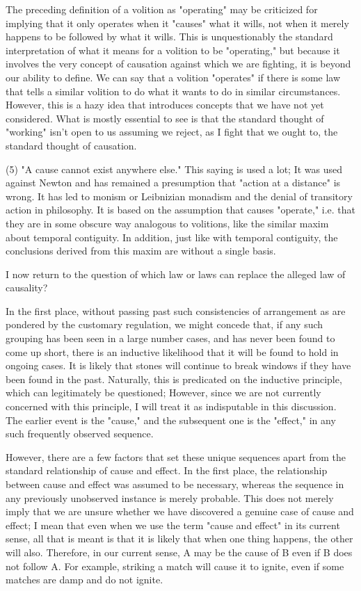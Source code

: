 \documentclass[a4paper,12pt]{book}[2004/02/16]
\theoremstyle{ilemma}
\theoremstyle{itheorem}
\theoremstyle{iother}
\theoremstyle{icorollary}
\theoremstyle{numcorollary}
\theoremstyle{idefinition}
\begin{document}
The preceding definition of a volition as "operating" may be criticized for implying that it only operates when it "causes" what it wills, not when it merely happens to be followed by what it wills. This is unquestionably the standard interpretation of what it means for a volition to be "operating," but because it involves the very concept of causation against which we are fighting, it is beyond our ability to define. We can say that a volition "operates" if there is some law that tells a similar volition to do what it wants to do in similar circumstances. However, this is a hazy idea that introduces concepts that we have not yet considered. What is mostly
essential to see is that the standard thought of "working" isn't
open to us assuming we reject, as I fight that we ought to, the standard thought
of causation.

(5) "A cause cannot exist anywhere else." This saying is used a lot; It was used against Newton and has remained a presumption that "action at a distance" is wrong. It has led to monism or Leibnizian monadism and the denial of transitory action in philosophy. It is based on the assumption that causes "operate," i.e. that they are in some obscure way analogous to volitions, like the similar maxim about temporal contiguity. In addition, just like with temporal contiguity, the conclusions derived from this maxim are without a single basis.

I now return to the question of which law or laws can replace the alleged law of causality?

In the first place, without passing past such consistencies of arrangement as are
pondered by the customary regulation, we might concede that, if any such
grouping has been seen in a large number cases, and has never been
found to come up short, there is an inductive likelihood that it will be found
to hold in ongoing cases. It is likely that stones will continue to break windows if they have been found in the past. Naturally, this is predicated on the inductive principle, which can legitimately be questioned; However, since we are not currently concerned with this principle, I will treat it as indisputable in this discussion. The earlier event is the "cause," and the subsequent one is the "effect," in any such frequently observed sequence.

However, there are a few factors that set these unique sequences apart from the standard relationship of cause and effect. In the first place, the relationship between cause and effect was assumed to be necessary, whereas the sequence in any previously unobserved instance is merely probable. This does not merely imply that we are unsure whether we have discovered a genuine case of cause and effect; I mean that even when we use the term "cause and effect" in its current sense, all that is meant is that it is likely that when one thing happens, the other will also. Therefore, in our current sense, A may be the cause of B even if B does not follow A. For example, striking a match will cause it to ignite, even if some matches are damp and do not ignite.
\end{document}
